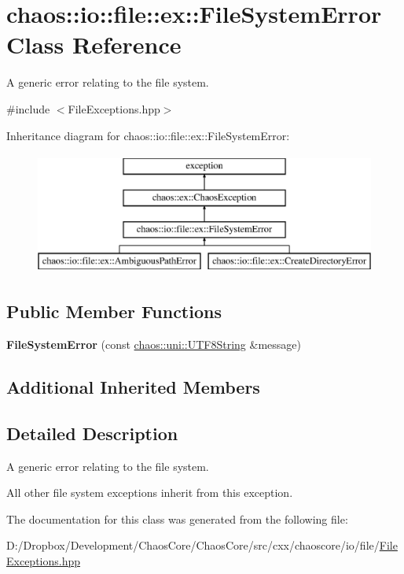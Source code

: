 \hypertarget{classchaos_1_1io_1_1file_1_1ex_1_1_file_system_error}{}\section{chaos\+:\+:io\+:\+:file\+:\+:ex\+:\+:File\+System\+Error Class Reference}
\label{classchaos_1_1io_1_1file_1_1ex_1_1_file_system_error}


A generic error relating to the file system.  




{\ttfamily \#include $<$File\+Exceptions.\+hpp$>$}

Inheritance diagram for chaos\+:\+:io\+:\+:file\+:\+:ex\+:\+:File\+System\+Error\+:\begin{figure}[H]
\begin{center}
\leavevmode
\includegraphics[height=4.000000cm]{classchaos_1_1io_1_1file_1_1ex_1_1_file_system_error}
\end{center}
\end{figure}
\subsection*{Public Member Functions}
\begin{DoxyCompactItemize}
\item 
\hypertarget{classchaos_1_1io_1_1file_1_1ex_1_1_file_system_error_a5164efe6e9bdcd5d9aa222514b6e1b4b}{}{\bfseries File\+System\+Error} (const \hyperlink{classchaos_1_1uni_1_1_u_t_f8_string}{chaos\+::uni\+::\+U\+T\+F8\+String} \&message)\label{classchaos_1_1io_1_1file_1_1ex_1_1_file_system_error_a5164efe6e9bdcd5d9aa222514b6e1b4b}

\end{DoxyCompactItemize}
\subsection*{Additional Inherited Members}


\subsection{Detailed Description}
A generic error relating to the file system. 

All other file system exceptions inherit from this exception. 

The documentation for this class was generated from the following file\+:\begin{DoxyCompactItemize}
\item 
D\+:/\+Dropbox/\+Development/\+Chaos\+Core/\+Chaos\+Core/src/cxx/chaoscore/io/file/\hyperlink{_file_exceptions_8hpp}{File\+Exceptions.\+hpp}\end{DoxyCompactItemize}
